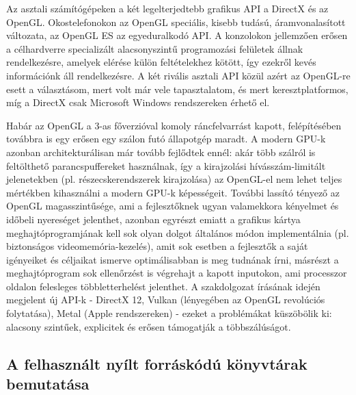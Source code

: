 Az asztali számítógépeken a két legelterjedtebb grafikus API a DirectX és az OpenGL. Okostelefonokon az OpenGL speciális, kisebb tudású, áramvonalasított változata, az OpenGL ES az egyeduralkodó API. A konzolokon jellemzően erősen a célhardverre specializált alacsonyszintű programozási felületek állnak rendelkezésre, amelyek elérése külön feltételekhez kötött, így ezekről kevés információnk áll rendelkezésre. A két rivális asztali API közül azért az OpenGL-re esett a választásom, mert volt már vele tapasztalatom, és mert keresztplatformos, míg a DirectX csak Microsoft Windows rendszereken érhető el.

Habár az OpenGL a 3-as főverzióval komoly ráncfelvarrást kapott, felépítésében továbbra is egy erősen egy szálon futó állapotgép maradt. A modern GPU-k azonban architekturálisan már tovább fejlődtek ennél: akár több szálról is feltölthető parancspuffereket használnak, így a kirajzolási hívásszám-limitált jelenetekben (pl. részecskerendszerek kirajzolása) az OpenGL-el nem lehet teljes mértékben kihasználni a modern GPU-k képességeit. További lassító tényező az OpenGL magasszintűsége, ami a fejlesztőknek ugyan valamekkora kényelmet és időbeli nyereséget jelenthet, azonban egyrészt emiatt a grafikus kártya meghajtóprogramjának kell sok olyan dolgot általános módon implementálnia (pl. biztonságos videomemória-kezelés), amit sok esetben a fejlesztők a saját igényeiket és céljaikat ismerve optimálisabban is meg tudnának írni, másrészt a meghajtóprogram sok ellenőrzést is végrehajt a kapott inputokon, ami processzor oldalon felesleges többletterhelést jelenthet. A szakdolgozat írásának idején megjelent új API-k - DirectX 12, Vulkan (lényegében az OpenGL revolúciós folytatása), Metal (Apple rendszereken) - ezeket a problémákat küszöbölik ki: alacsony szintűek, explicitek és erősen támogatják a többszálúságot.

\subsection{A felhasznált nyílt forráskódú könyvtárak bemutatása}

